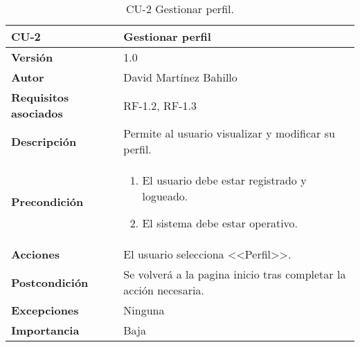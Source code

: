 \begin{table}[p]
	\centering
	\begin{tabularx}{\linewidth}{ p{} p{} }
		\toprule
		\textbf{CU-2}    & \textbf{Gestionar perfil}\\
		\midrule
		\textbf{Versión}              & 1.0    \\
		\textbf{Autor}                & David Martínez Bahillo \\
		\textbf{Requisitos asociados} & RF-1.2, RF-1.3 \\
		\textbf{Descripción}          & Permite al usuario visualizar y modificar su perfil. \\
		\textbf{Precondición}         &  
		\begin{enumerate}
		\def\labelenumi{\arabic{enumi}.}
			\tightlist
			\item El usuario debe estar registrado y logueado.
			\item El sistema debe estar operativo.
		\end{enumerate}\\
		\textbf{Acciones}             & El usuario selecciona <<Perfil>>.\\
		\textbf{Postcondición}        & Se volverá a la pagina inicio tras completar la acción necesaria. \\
		\textbf{Excepciones}          & Ninguna \\
		\textbf{Importancia}          & Baja  \\
		\bottomrule
	\end{tabularx}
	\caption{CU-2 Gestionar perfil.}
\end{table}



